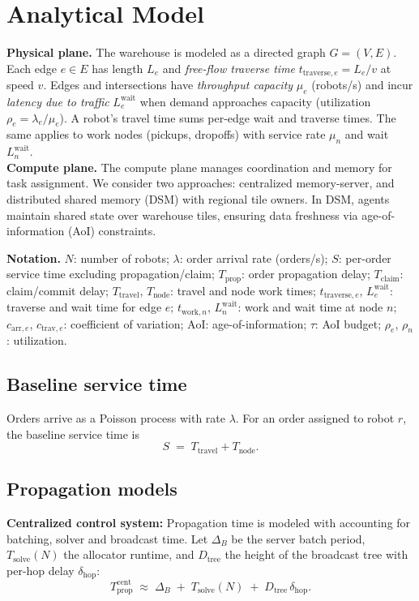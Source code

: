 \section{Analytical Model}

\noindent\textbf{Physical plane.} The warehouse is modeled as a directed graph $G=(V,E)$. Each edge $e\in E$ has length $L_e$ and \emph{free-flow traverse time} $t_{\text{traverse},e}=L_e/v$ at speed $v$.
Edges and intersections have \emph{throughput capacity} $\mu_e$ (robots/s) and incur \emph{latency due to traffic}
$L^{\text{wait}}_e$ when demand approaches capacity (utilization $\rho_e=\lambda_e/\mu_e$).
A robot’s travel time sums per-edge wait and traverse times. The same applies to work nodes (pickups, dropoffs) with service rate $\mu_n$ and wait $L^{\text{wait}}_n$.\\
\noindent\textbf{Compute plane.} The compute plane manages coordination and memory for task assignment. We consider two approaches: centralized memory-server, and distributed shared memory (DSM) with regional tile owners. In DSM, agents maintain shared state over warehouse tiles, ensuring data freshness via age-of-information (AoI) constraints.


\noindent\textbf{Notation.}
$N$: number of robots;
$\lambda$: order arrival rate (orders/s);
$S$: per-order service time excluding propagation/claim;
$T_{\text{prop}}$: order propagation delay;
$T_{\text{claim}}$: claim/commit delay;
$T_{\text{travel}}$, $T_{\text{node}}$: travel and node work times;
$t_{\text{traverse},e}$, $L_{e}^{\text{wait}}$: traverse and wait time for edge $e$;
$t_{\text{work},n}$, $L_{n}^{\text{wait}}$: work and wait time at node $n$;
$c_{\text{arr},e}$, $c_{\text{trav},e}$: coefficient of variation;
$\text{AoI}$: age-of-information;
$\tau$: AoI budget;
$\rho_e$, $\rho_n$: utilization.

\subsection*{Baseline service  time}
Orders arrive as a Poisson process with rate $\lambda$.
For an order assigned to robot $r$, the baseline service time is
\begin{equation}
  S \;=\; T_{\text{travel}} + T_{\text{node}}.
\end{equation}

\subsection*{Propagation models}
\noindent\textbf{Centralized control system:} Propagation time is modeled with accounting for batching, solver and broadcast time. Let $\Delta_B$ be the server batch period, $T_{\text{solve}}(N)$ the allocator runtime, and $D_{\text{tree}}$ the height of the broadcast tree with per-hop delay $\delta_{\text{hop}}$:
\begin{equation}
  T_{\text{prop}}^{\text{cent}}
  \;\approx\;
  \Delta_B \;+\; T_{\text{solve}}(N) \;+\; D_{\text{tree}}\,\delta_{\text{hop}}.
  \label{eq:cent-prop}
\end{equation}

